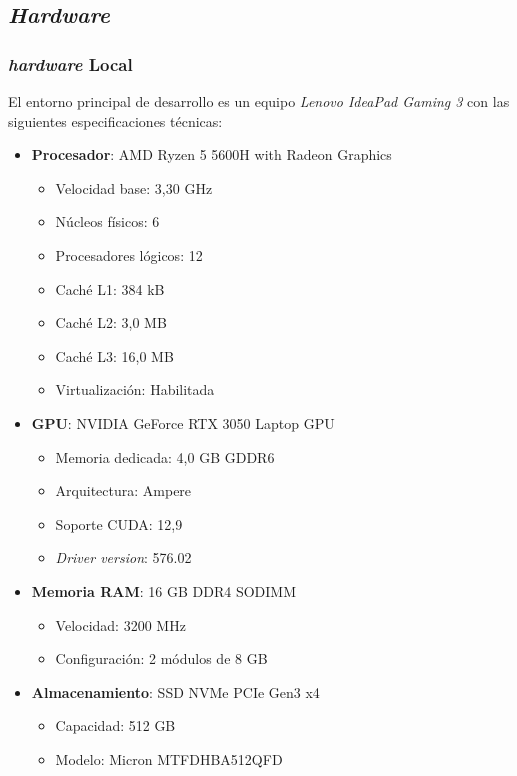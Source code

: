 \documentclass[12pt,a4paper,onecolumn,oneside]{report}
\begin{document}
\subsection{\textit{Hardware}}
\subsubsection{\textit{hardware} Local}
\label{sec:hardware_local}
El entorno principal de desarrollo es un equipo \textit{Lenovo IdeaPad Gaming 3} con las siguientes especificaciones técnicas:

\begin{itemize}
    \item \textbf{Procesador}: AMD Ryzen 5 5600H with Radeon Graphics
    \begin{itemize}
        \item Velocidad base: 3,30 GHz
        \item Núcleos físicos: 6
        \item Procesadores lógicos: 12
        \item Caché L1: 384 kB
        \item Caché L2: 3,0 MB  
        \item Caché L3: 16,0 MB
        \item Virtualización: Habilitada
    \end{itemize}
    
    \item \textbf{GPU}: NVIDIA GeForce RTX 3050 Laptop GPU
    \begin{itemize}
        \item Memoria dedicada: 4,0 GB GDDR6
        \item Arquitectura: Ampere
        \item Soporte CUDA: 12,9
        \item \textit{Driver version}: 576.02
    \end{itemize}
    
    \item \textbf{Memoria RAM}: 16 GB DDR4 SODIMM
    \begin{itemize}
        \item Velocidad: 3200 MHz
        \item Configuración: 2 módulos de 8 GB
    \end{itemize}
    
    \item \textbf{Almacenamiento}: SSD NVMe PCIe Gen3 x4
    \begin{itemize}
        \item Capacidad: 512 GB
        \item Modelo: Micron MTFDHBA512QFD
    \end{itemize}
\end{itemize}
\end{document}
